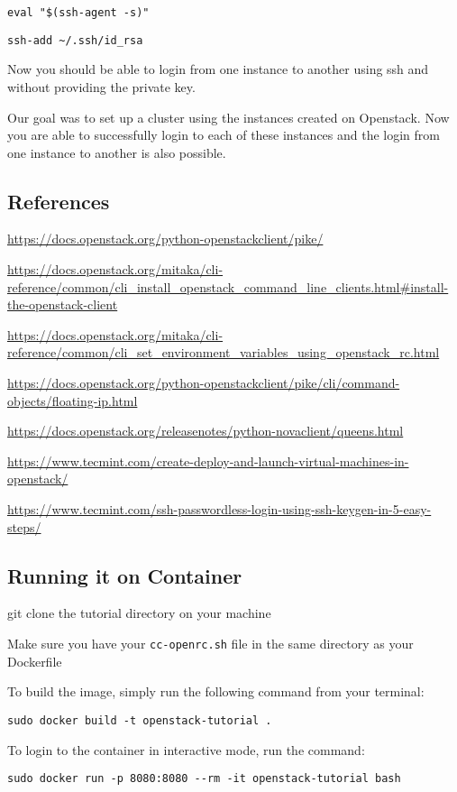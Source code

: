 \texttt{eval\ "\$(ssh-agent\ -s)"}

\texttt{ssh-add\ \textasciitilde{}/.ssh/id\_rsa}

Now you should be able to login from one instance to another using ssh
and without providing the private key.

Our goal was to set up a cluster using the instances created on
Openstack. Now you are able to successfully login to each of these
instances and the login from one instance to another is also possible.

\subsection{References}

\url{https://docs.openstack.org/python-openstackclient/pike/}

\url{https://docs.openstack.org/mitaka/cli-reference/common/cli_install_openstack_command_line_clients.html\#install-the-openstack-client}

\url{https://docs.openstack.org/mitaka/cli-reference/common/cli_set_environment_variables_using_openstack_rc.html}

\url{https://docs.openstack.org/python-openstackclient/pike/cli/command-objects/floating-ip.html}

\url{https://docs.openstack.org/releasenotes/python-novaclient/queens.html}

\url{https://www.tecmint.com/create-deploy-and-launch-virtual-machines-in-openstack/}

\url{https://www.tecmint.com/ssh-passwordless-login-using-ssh-keygen-in-5-easy-steps/}

\subsection{Running it on Container}

git clone the tutorial directory on your machine

Make sure you have your \texttt{cc-openrc.sh} file in the same directory
as your Dockerfile

To build the image, simply run the following command from your terminal:

\texttt{sudo\ docker\ build\ -t\ openstack-tutorial\ .}

To login to the container in interactive mode, run the command:

\texttt{sudo\ docker\ run\ -p\ 8080:8080\ -\/-rm\ -it\ openstack-tutorial\ bash}

